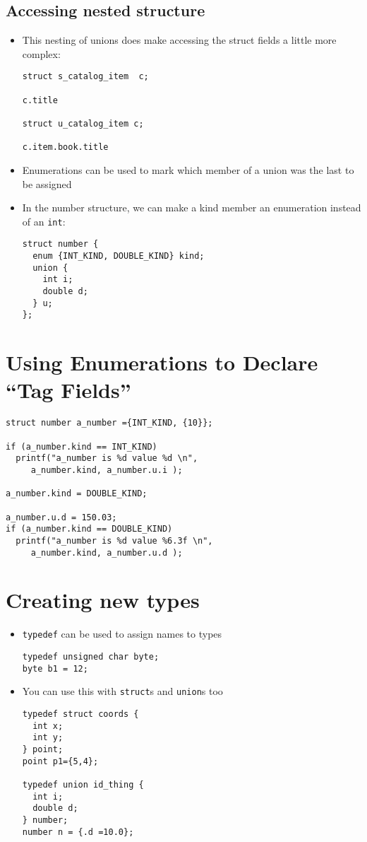 \documentclass{article}
\begin{document}
\subsection{Accessing nested structure}
\begin{itemize}
\item This nesting of unions does make accessing the struct fields a little more complex: 
\begin{verbatim}
struct s_catalog_item  c; 

c.title

struct u_catalog_item c;

c.item.book.title
\end{verbatim}

\item Enumerations can be used to mark which member of a union was the last to be assigned

\item In the number structure, we can make a kind member an enumeration instead of an \verb!int!:
\begin{verbatim}
struct number {
  enum {INT_KIND, DOUBLE_KIND} kind;
  union {
    int i;
    double d;
  } u;
};
\end{verbatim}
\end{itemize}



\section{Using Enumerations to Declare ``Tag Fields''}
\begin{verbatim}
struct number a_number ={INT_KIND, {10}};

if (a_number.kind == INT_KIND)
  printf("a_number is %d value %d \n", 
     a_number.kind, a_number.u.i );

a_number.kind = DOUBLE_KIND;

a_number.u.d = 150.03;
if (a_number.kind == DOUBLE_KIND)
  printf("a_number is %d value %6.3f \n", 
     a_number.kind, a_number.u.d );
\end{verbatim}



\section{Creating new types}
\begin{itemize}
\item \verb!typedef! can be used to assign names to types
\begin{verbatim}
typedef unsigned char byte;
byte b1 = 12;
\end{verbatim}
\item You can use this with \verb!struct!s and \verb!union!s too
\begin{verbatim}
typedef struct coords {
  int x;
  int y;
} point;
point p1={5,4};

typedef union id_thing {
  int i;
  double d;
} number;
number n = {.d =10.0};
\end{verbatim}
\end{itemize}
\end{document}
